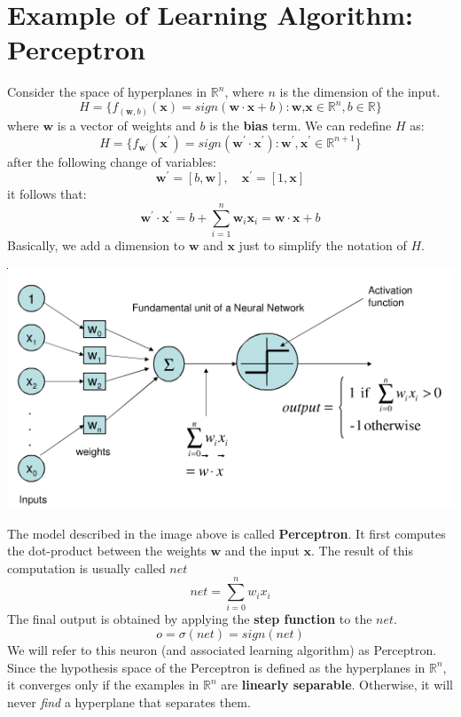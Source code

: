 \section{Example of Learning Algorithm: Perceptron}
Consider the space of hyperplanes in $\mathbb{R}^{n}$, where $n$ is the dimension of the input.
\[H = \{f_{(\textbf{w},b)}(\textbf{x}) = sign(\textbf{w} \cdot \textbf{x} + b): \textbf{w,x} \in \mathbb{R}^{n}, b \in \mathbb{R}\}\]
where $\textbf{w}$ is a vector of weights and $b$ is the \textbf{bias} term.\newline\newline
We can redefine $H$ as:
\[H = \{f_{\textbf{w}^{'}}(\textbf{x}^{'}) = sign(\textbf{w}^{'} \cdot \textbf{x}^{'}): \textbf{w}^{'}, \textbf{x}^{'} \in \mathbb{R}^{n+1}\}\]
after the following change of variables:
\[\textbf{w}^{'} = [b, \textbf{w}], \quad \textbf{x}^{'} = [1, \textbf{x}]\]
it follows that:
\[\textbf{w}^{'} \cdot \textbf{x}^{'} = b + \sum_{i = 1}^{n}\textbf{w}_{i}\textbf{x}_{i} = \textbf{w} \cdot \textbf{x} + b\]
Basically, we add a dimension to $\textbf{w}$ and $\textbf{x}$ just to simplify the notation of $H$.
\begin{center}
    \includegraphics[scale=0.5]{images/perceptron.png}
\end{center}
The model described in the image above is called \textbf{Perceptron}. It first computes the dot-product between the weights $\textbf{w}$ and the input $\textbf{x}$. The result of this computation is usually called $net$
\[net = \sum_{i=0}^{n}w_{i}x_{i}\]
The final output is obtained by applying the \textbf{step function} to the $net$.
\[o = \sigma(net) = sign(net)\]
We will refer to this neuron (and associated learning algorithm) as Perceptron.\newline\newline
Since the hypothesis space of the Perceptron is defined as the hyperplanes in $\mathbb{R}^{n}$, it converges only if the examples in $\mathbb{R}^{n}$ are \textbf{linearly separable}. Otherwise, it will never \textit{find} a hyperplane that separates them.
